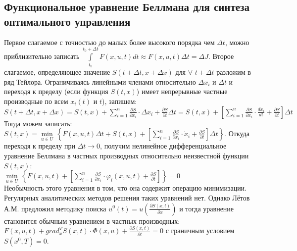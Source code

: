 \documentclass[preprint,russian,a5paper,10pt,twoside,mediummath]{ncc}
\begin{document}
	\subsection{Функциональное уравнение Беллмана для синтеза оптимального управления\label{dyn_prog:Bellman_equation}}
\par Первое слагаемое с точностью до малых более высокого порядка чем $\Delta t$, можно приблизительно записать $\int\limits_{{{t}_{0}}}^{{{t}_{0}}+\Delta t}{F\left( x,u,t \right)}dt\approx F\left( x,u,t \right)\Delta t=\Delta J$. Второе слагаемое, определяющее значение $S\left( t+\Delta t,x+\Delta x \right)$ для $\forall $ $t+\Delta t$ разложим в ряд Тейлора. Ограничиваясь линейными членами относительно $\Delta {{x}_{i}}$ и $\Delta t$ и переходя к пределу (если функция $S\left( t,x \right)$) имеет непрерывные частные производные по всем ${{x}_{i}}\left( t \right)$ и $t$), запишем:
\\$S\left( t+\Delta t,x+\Delta x \right)=S\left( t,x \right)+\sum\limits_{i=1}^{n}{\frac{\partial S}{\partial {{x}_{i}}}}\cdot \Delta {{x}_{i}}+\frac{\partial S}{\partial t}\Delta t=S\left( t,x \right)+\left[ \sum\limits_{i=1}^{n}{\frac{\partial S}{\partial {{x}_{i}}}}\cdot \frac{d{{x}_{i}}}{dt}+\frac{\partial S}{\partial t} \right]\Delta t$
\\Тогда можем записать:
\\$S\left( t,x \right)=\underset{u\in U}{\mathop{\min }}\,\left\{ F\left( x,u,t \right)\Delta t+S\left( t,x \right)+\left[ \sum\limits_{i=1}^{n}{\frac{\partial S}{\partial {{x}_{i}}}\cdot {{{\dot{x}}}_{i}}+\frac{\partial S}{\partial t}} \right]\Delta t \right\}$. Откуда переходя к пределу при $\Delta t\to 0$, получим нелинейное дифференциальное уравнение Беллмана в частных производных относительно неизвестной функции $S\left( t,x \right)$:
\\$\underset{u\in U}{\mathop{\min }}\,\left\{ F\left( x,u,t \right)+\left[ \sum\limits_{i=1}^{n}{\frac{\partial S}{\partial {{x}_{i}}}\cdot {{\varphi }_{i}}\left( x,u,t \right)+\frac{\partial S}{\partial t}} \right] \right\}=0$ 
\\Необычность этого уравнения в том, что она содержит операцию минимизации. Регулярных аналитических методов решения таких уравнений нет. Однако Лётов А.М. предложил методику поиска ${{u}^{0}}\left( t \right)=u\left( \frac{\partial S\left( x,t \right)}{\partial x} \right)$ и тогда уравнение становится обычным уравнением в частных производных:
\\$F\left( \dot{x},u,t \right)+grad_{x}^{T}S\left( x,t \right)\cdot \Phi \left( x,u \right)+\frac{\partial S\left( x,t \right)}{\partial t}=0$ с граничным условием $S\left( {{x}^{0}},T \right)=0$.
\end{document}
